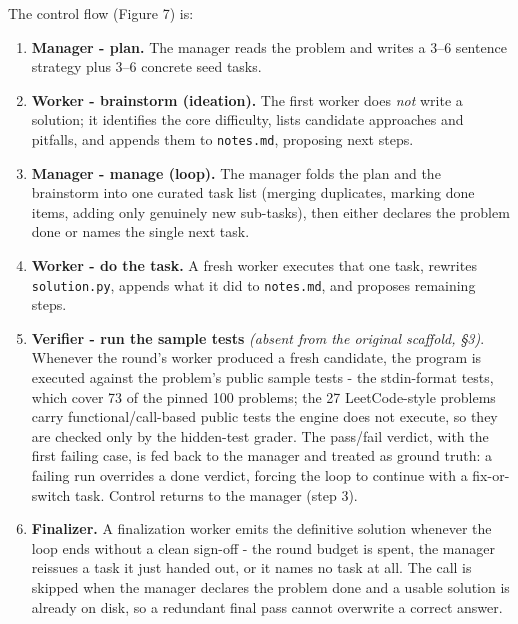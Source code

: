 \documentclass[11pt]{article}
\begin{document}
The control flow (Figure 7) is:

\begin{enumerate}
  \item \textbf{Manager - plan.} The manager reads the problem and writes a 3--6
  sentence strategy plus 3--6 concrete seed tasks.

  \item \textbf{Worker - brainstorm (ideation).} The first worker does \textit{not}
  write a solution; it identifies the core difficulty, lists candidate approaches and
  pitfalls, and appends them to \texttt{notes.md}, proposing next steps.

  \item \textbf{Manager - manage (loop).} The manager folds the plan and the brainstorm
  into one curated task list (merging duplicates, marking done items, adding only
  genuinely new sub-tasks), then either declares the problem done or names the
  single next task.

  \item \textbf{Worker - do the task.} A fresh worker executes that one task, rewrites
  \texttt{solution.py}, appends what it did to \texttt{notes.md}, and proposes remaining
  steps.

  \item \textbf{Verifier - run the sample tests} \textit{(absent from the original
  scaffold, \S3)}. Whenever the round's worker produced a fresh candidate,
  the program is executed against the problem's public sample tests - the stdin-format
  tests, which cover 73 of the pinned 100 problems; the 27 LeetCode-style problems carry
  functional/call-based public tests the engine does not execute, so they are checked only
  by the hidden-test grader. The pass/fail verdict, with the first failing case, is fed
  back to the manager and treated as ground truth: a failing run overrides a
  done verdict, forcing the loop to continue with a fix-or-switch task. Control
  returns to the manager (step 3).

  \item \textbf{Finalizer.} A finalization worker emits the definitive solution whenever
  the loop ends without a clean sign-off - the round budget is spent, the manager
  reissues a task it just handed out, or it names no task at all. The call is skipped when
  the manager declares the problem done and a usable solution is already on disk, so a
  redundant final pass cannot overwrite a correct answer.
\end{enumerate}
\end{document}
